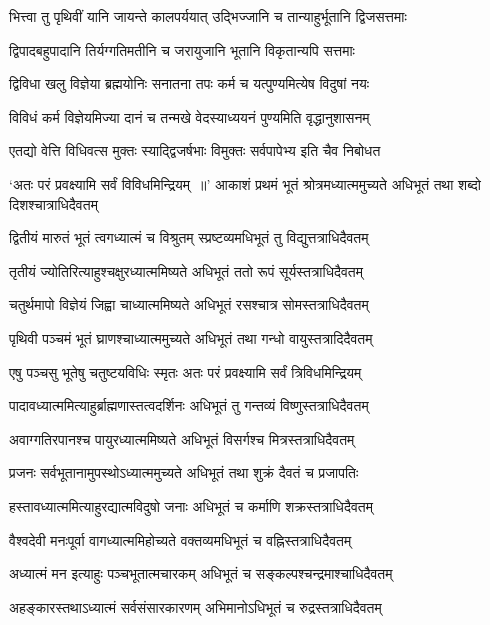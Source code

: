 \twolineshloka
{भित्त्वा तु पृथिवीं यानि जायन्ते कालपर्ययात्}
{उद्भिज्जानि च तान्याहुर्भूतानि द्विजसत्तमाः}


\twolineshloka
{द्विपादबहुपादानि तिर्यग्गतिमतीनि च}
{जरायुजानि भूतानि विकृतान्यपि सत्तमाः}


\twolineshloka
{द्विविधा खलु विज्ञेया ब्रह्मयोनिः सनातना}
{तपः कर्म च यत्पुण्यमित्येष विदुषां नयः}


\twolineshloka
{विविधं कर्म विज्ञेयमिज्या दानं च तन्मखे}
{वेदस्याध्ययनं पुण्यमिति वृद्धानुशासनम्}


\twolineshloka
{एतद्यो वेत्ति विधिवत्स मुक्तः स्याद्द्विजर्षभाः}
{विमुक्तः सर्वपापेभ्य इति चैव निबोधत}


`अतः परं प्रवक्ष्यामि सर्वं विविधमिन्द्रियम् ॥'
\twolineshloka
{आकाशं प्रथमं भूतं श्रोत्रमध्यात्ममुच्यते}
{अधिभूतं तथा शब्दो दिशश्चात्राधिदैवतम्}


\twolineshloka
{द्वितीयं मारुतं भूतं त्वगध्यात्मं च विश्रुतम्}
{स्प्रष्टव्यमधिभूतं तु विद्युत्तत्राधिदैवतम्}


\twolineshloka
{तृतीयं ज्योतिरित्याहुश्चक्षुरध्यात्ममिष्यते}
{अधिभूतं ततो रूपं सूर्यस्तत्राधिदैवतम्}


\twolineshloka
{चतुर्थमापो विज्ञेयं जिह्वा चाध्यात्ममिष्यते}
{अधिभूतं रसश्चात्र सोमस्तत्राधिदैवतम्}


\twolineshloka
{पृथिवी पञ्चमं भूतं घ्राणश्चाध्यात्ममुच्यते}
{अधिभूतं तथा गन्धो वायुस्तत्रादिदैवतम्}


\twolineshloka
{एषु पञ्चसु भूतेषु चतुष्टयविधिः स्मृतः}
{अतः परं प्रवक्ष्यामि सर्वं त्रिविधमिन्द्रियम्}


\twolineshloka
{पादावध्यात्ममित्याहुर्ब्राह्मणास्तत्वदर्शिनः}
{अधिभूतं तु गन्तव्यं विष्णुस्तत्राधिदैवतम्}


\twolineshloka
{अवाग्गतिरपानश्च पायुरध्यात्ममिष्यते}
{अधिभूतं विसर्गश्च मित्रस्तत्राधिदैवतम्}


\twolineshloka
{प्रजनः सर्वभूतानामुपस्थोऽध्यात्ममुच्यते}
{अधिभूतं तथा शुक्रं दैवतं च प्रजापतिः}


\twolineshloka
{हस्तावध्यात्ममित्याहुरद्यात्मविदुषो जनाः}
{अधिभूतं च कर्माणि शक्रस्तत्राधिदैवतम्}


\twolineshloka
{वैश्वदेवी मनःपूर्वा वागध्यात्ममिहोच्यते}
{वक्तव्यमधिभूतं च वह्निस्तत्राधिदैवतम्}


\twolineshloka
{अध्यात्मं मन इत्याहुः पञ्चभूतात्मचारकम्}
{अधिभूतं च सङ्कल्पश्चन्द्रमाश्चाधिदैवतम्}


\twolineshloka
{अहङ्कारस्तथाऽध्यात्मं सर्वसंसारकारणम्}
{अभिमानोऽधिभूतं च रुद्रस्तत्राधिदैवतम्}


